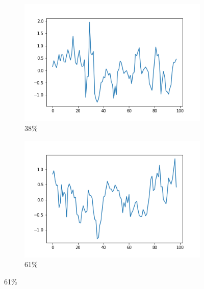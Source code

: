 \begin{figure}
  \begin{subfigure}[t]{0.45\textwidth}
  \centering
    \includegraphics[width=\linewidth]{proba_38}
    \caption{
      38\%
    }
    \label{fig:analysis-svc-proba-38}
  \end{subfigure}%
  \begin{subfigure}[t]{0.45\textwidth}
  \centering
    \includegraphics[width=\linewidth]{proba_61}
    \caption{
      61\%
    }
    \label{fig:analysis-svc-proba-61}
  \end{subfigure}


\end{figure}
